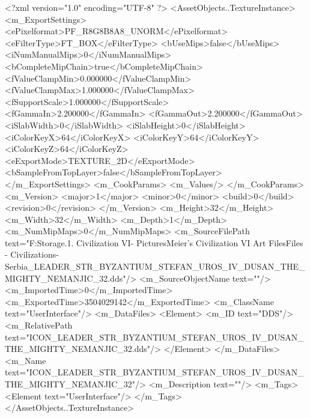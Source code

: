 <?xml version="1.0" encoding="UTF-8" ?>
<AssetObjects..TextureInstance>
	<m_ExportSettings>
		<ePixelformat>PF_R8G8B8A8_UNORM</ePixelformat>
		<eFilterType>FT_BOX</eFilterType>
		<bUseMips>false</bUseMips>
		<iNumManualMips>0</iNumManualMips>
		<bCompleteMipChain>true</bCompleteMipChain>
		<fValueClampMin>0.000000</fValueClampMin>
		<fValueClampMax>1.000000</fValueClampMax>
		<fSupportScale>1.000000</fSupportScale>
		<fGammaIn>2.200000</fGammaIn>
		<fGammaOut>2.200000</fGammaOut>
		<iSlabWidth>0</iSlabWidth>
		<iSlabHeight>0</iSlabHeight>
		<iColorKeyX>64</iColorKeyX>
		<iColorKeyY>64</iColorKeyY>
		<iColorKeyZ>64</iColorKeyZ>
		<eExportMode>TEXTURE_2D</eExportMode>
		<bSampleFromTopLayer>false</bSampleFromTopLayer>
	</m_ExportSettings>
	<m_CookParams>
		<m_Values/>
	</m_CookParams>
	<m_Version>
		<major>1</major>
		<minor>0</minor>
		<build>0</build>
		<revision>0</revision>
	</m_Version>
	<m_Height>32</m_Height>
	<m_Width>32</m_Width>
	<m_Depth>1</m_Depth>
	<m_NumMipMaps>0</m_NumMipMaps>
	<m_SourceFilePath text="F:\Mod Storage\2.1. Civilization VI\Mods\Archive - Pictures\Sid Meier's Civilization VI Art Files\Art Files - Civilizations\Civilization - Serbia\ICON_LEADER_STR_BYZANTIUM_STEFAN_UROS_IV_DUSAN_THE_MIGHTY_NEMANJIC_32.dds"/>
	<m_SourceObjectName text=""/>
	<m_ImportedTime>0</m_ImportedTime>
	<m_ExportedTime>3504029142</m_ExportedTime>
	<m_ClassName text="UserInterface"/>
	<m_DataFiles>
		<Element>
			<m_ID text="DDS"/>
			<m_RelativePath text="ICON_LEADER_STR_BYZANTIUM_STEFAN_UROS_IV_DUSAN_THE_MIGHTY_NEMANJIC_32.dds"/>
		</Element>
	</m_DataFiles>
	<m_Name text="ICON_LEADER_STR_BYZANTIUM_STEFAN_UROS_IV_DUSAN_THE_MIGHTY_NEMANJIC_32"/>
	<m_Description text=""/>
	<m_Tags>
		<Element text="UserInterface"/>
	</m_Tags>
</AssetObjects..TextureInstance>

